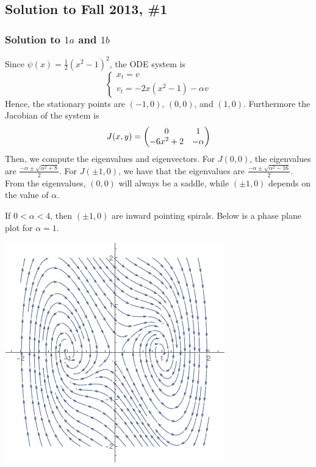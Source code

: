\subsection*{Solution to Fall 2013, \#1}
\label{F13Q1}

\subsubsection*{Solution to $1a$ and $1b$}

Since $\psi(x) = \frac{1}{2} (x^2-1)^2$, the ODE system is
$$ \left\{
\begin{array}{l}
x_t = v \\
v_t = -2x(x^2-1) - \alpha v
\end{array}
\right.
$$
Hence, the stationary points are $(-1,0)$, $(0,0)$, and $(1,0)$. Furthermore the Jacobian of the system is
$$ J(x,y) = \begin{pmatrix} 0 & 1 \\ -6x^2 + 2 & -\alpha\end{pmatrix} $$
Then, we compute the eigenvalues and eigenvectors. For $J(0,0)$, the eigenvalues are $\frac{-\alpha \pm \sqrt{\alpha^2 + 8}}{2}$. For $J(\pm 1,0)$, we have that
the eigenvalues are $\frac{-\alpha \pm \sqrt{\alpha^2 - 16}}{2}$.
From the eigenvalues, $(0,0)$ will always be a saddle, while $(\pm 1, 0)$ depends on the value of $\alpha$.

If $0 < \alpha < 4$, then $(\pm 1, 0)$ are inward pointing spirals. Below is a phase plane plot for $\alpha = 1$.
\begin{center}
\includegraphics[scale=0.75]{./_Figures/f1311.png}
\end{center}

